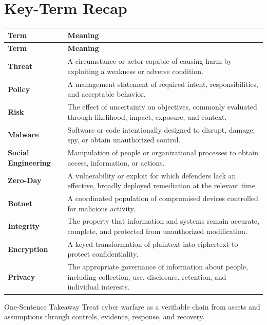 \documentclass[11pt,letterpaper]{article}
\begin{document}
\section*{Key-Term Recap}
\begin{longtable}{>{\raggedright\arraybackslash}p{}>{\raggedright\arraybackslash}p{}}
\toprule\rowcolor{Navy}\color{white}\textbf{Term} & \color{white}\textbf{Meaning}\\\midrule
\endfirsthead
\toprule\rowcolor{Navy}\color{white}\textbf{Term} & \color{white}\textbf{Meaning}\\\midrule
\endhead
\textbf{Threat} & A circumstance or actor capable of causing harm by exploiting a weakness or adverse condition. \\\midrule
\textbf{Policy} & A management statement of required intent, responsibilities, and acceptable behavior. \\\midrule
\textbf{Risk} & The effect of uncertainty on objectives, commonly evaluated through likelihood, impact, exposure, and context. \\\midrule
\textbf{Malware} & Software or code intentionally designed to disrupt, damage, spy, or obtain unauthorized control. \\\midrule
\textbf{Social Engineering} & Manipulation of people or organizational processes to obtain access, information, or actions. \\\midrule
\textbf{Zero-Day} & A vulnerability or exploit for which defenders lack an effective, broadly deployed remediation at the relevant time. \\\midrule
\textbf{Botnet} & A coordinated population of compromised devices controlled for malicious activity. \\\midrule
\textbf{Integrity} & The property that information and systems remain accurate, complete, and protected from unauthorized modification. \\\midrule
\textbf{Encryption} & A keyed transformation of plaintext into ciphertext to protect confidentiality. \\\midrule
\textbf{Privacy} & The appropriate governance of information about people, including collection, use, disclosure, retention, and individual interests. \\\midrule
\bottomrule
\end{longtable}
\begin{CornellExamBox}{One-Sentence Takeaway}
Treat cyber warfare as a verifiable chain from assets and assumptions through controls, evidence, response, and recovery.
\end{CornellExamBox}
\end{document}
